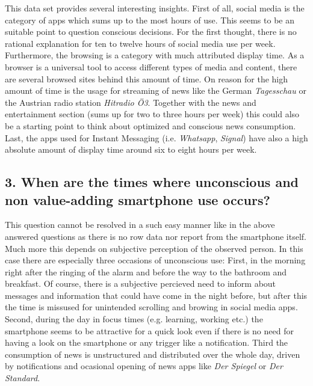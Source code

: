 \documentclass[11pt,letterpaper]{article}
\begin{document}
This data set provides several interesting insights. First of all, social media is the category of apps which sums up to the most hours of use. This seems to be an suitable point to question conscious decisions. For the first thought, there is no rational explanation for ten to twelve hours of social media use per week. Furthermore, the browsing is a category with much attributed display time. As a browser is a universal tool to access different types of media and content, there are several browsed sites behind this amount of time. On reason for the high amount of time is the usage for streaming of news like the German \textit{Tagesschau} or the Austrian radio station \textit{Hitradio Ö3}. Together with the news and entertainment section (sums up for two to three hours per week) this could also be a starting point to think about optimized and conscious news consumption. Last, the apps used for Instant Messaging (i.e. \textit{Whatsapp}, \textit{Signal}) have also a high absolute amount of display time around six to eight hours per week.

\subsection*{3. When are the times where unconscious and non value-adding smartphone use occurs?}
This question cannot be resolved in a such easy manner like in the above answered questions as there is no row data nor report from the smartphone itself. Much more this depends on subjective perception of the observed person. In this case there are especially three occasions of unconscious use: First, in the morning right after the ringing of the alarm and before the way to the bathroom and breakfast. Of course, there is a subjective percieved need to inform about messages and information that could have come in the night before, but after this the time is missused for unintended scrolling and browing in social media apps. Second, during the day in focus times (e.g. learning, working etc.) the smartphone seems to be attractive for a quick look even if there is no need for having a look on the smartphone or any trigger like a notification. Third the consumption of news is unstructured and distributed over the whole day, driven by notifications and ocasional opening of news apps like \textit{Der Spiegel} or \textit{Der Standard}.
\end{document}
